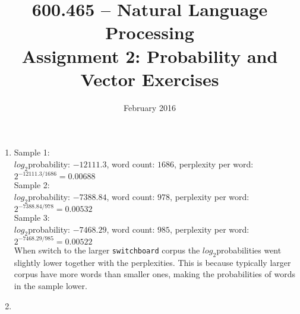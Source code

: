 \documentclass[10pt]{article}
\title{600.465 -- Natural Language Processing\\
Assignment 2: Probability and Vector Exercises}
\author{}
\date{February 2016}
\begin{document}
\maketitle
\begin{enumerate}
    \item  %
    Sample 1:\\ $log_2$probability: $-12111.3$, word count: $1686$, perplexity per word: $2^{-12111.3/1686} = 0.00688$\\
    Sample 2:\\ $log_2$probability: $-7388.84$, word count: $978$, perplexity per word: $2^{-7388.84/978} = 0.00532$\\
    Sample 3:\\ $log_2$probability: $-7468.29$, word count: $985$, perplexity per word: $2^{-7468.29/985} = 0.00522$\\
    
    When switch to the larger {\tt switchboard} corpus the $log_2$probabilities went slightly lower together with the perplexities. This is because typically larger corpus have more words than smaller ones, making the probabilities of words in the sample lower. 
    
    
    \item %
    
    
\end{enumerate}
\end{document}
